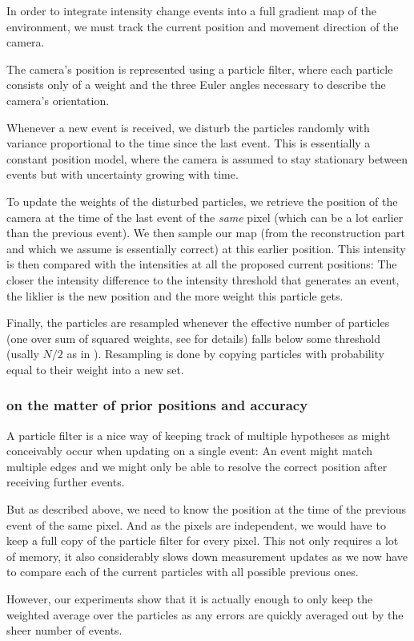 In order to integrate intensity change events into a full gradient map of the
environment, we must track the current position and movement direction of the
camera.

The camera's position is represented using a particle filter, where each
particle consists only of a weight and the three Euler angles necessary to
describe the camera's orientation.

Whenever a new event is received, we disturb the particles randomly with
variance proportional to the time since the last event. This is essentially a
constant position model, where the camera is assumed to stay stationary between
events but with uncertainty growing with time.

To update the weights of the disturbed particles, we retrieve the position of
the camera at the time of the last event of the \textit{same} pixel (which can be a
lot earlier than the previous event). We then sample our map (from the
reconstruction part and which we assume is essentially correct) at this earlier
position. This intensity is then compared with the intensities at all the
proposed current positions: The closer the intensity difference to the
intensity threshold that generates an event, the liklier is the new position
and the more weight this particle gets.

Finally, the particles are resampled whenever the effective number of particles
(one over sum of squared weights, see \cite{kim2014simultaneous} for details)
falls below some threshold (usally $N/2$ as in \cite{kim2014simultaneous}).
Resampling is done by copying particles with probability equal to their weight
into a new set.

\subsubsection{on the matter of prior positions and accuracy}

A particle filter is a nice way of keeping track of multiple hypotheses as
might conceivably occur when updating on a single event: An event might match
multiple edges and we might only be able to resolve the correct position after
receiving further events.

But as described above, we need to know the position at the time of the
previous event of the same pixel. And as the pixels are independent, we would
have to keep a full copy of the particle filter for every pixel. This not only
requires a lot of memory, it also considerably slows down measurement updates
as we now have to compare each of the current particles with all possible
previous ones.

However, our experiments show that it is actually enough to only keep the
weighted average over the particles as any errors are quickly averaged out by
the sheer number of events.
